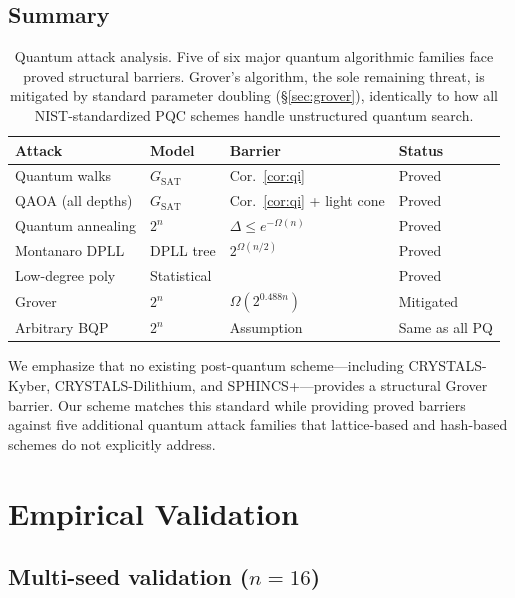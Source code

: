 \documentclass[11pt]{article}
\begin{document}
\subsection{Summary}

\begin{table}[ht]
\centering
\caption{Quantum attack analysis.  Five of six major quantum algorithmic families face proved structural barriers.  Grover's algorithm, the sole remaining threat, is mitigated by standard parameter doubling (\S\ref{sec:grover}), identically to how all NIST-standardized PQC schemes handle unstructured quantum search.}\label{tab:quantum}
\begin{tabular}{@{}llll@{}}
\toprule
Attack & Model & Barrier & Status \\
\midrule
Quantum walks     & $G_{\mathrm{SAT}}$ & Cor.~\ref{cor:qi} & Proved \\
QAOA (all depths) & $G_{\mathrm{SAT}}$ & Cor.~\ref{cor:qi} + light cone & Proved \\
Quantum annealing & $2^n$   & $\Delta \leq e^{-\Omega(n)}$ & Proved \\
Montanaro DPLL    & DPLL tree & $2^{\Omega(n/2)}$ & Proved \\
Low-degree poly   & Statistical & \cite{BH22} & Proved \\
Grover            & $2^n$   & $\Omega(2^{0.488n})$ & Mitigated \\
Arbitrary BQP     & $2^n$   & Assumption & Same as all PQ \\
\bottomrule
\end{tabular}
\end{table}

We emphasize that no existing post-quantum scheme---including CRYSTALS-Kyber, CRYSTALS-Dilithium, and SPHINCS+---provides a structural Grover barrier.  Our scheme matches this standard while providing proved barriers against five additional quantum attack families that lattice-based and hash-based schemes do not explicitly address.


\section{Empirical Validation}

\subsection{Multi-seed validation ($n = 16$)}
\end{document}
